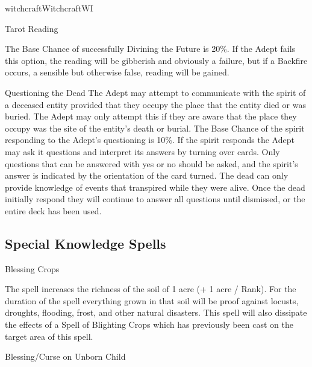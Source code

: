 \begin{college}[1.1]{witchcraft}{Witchcraft}{WI}
\begin{ritual}[Q-2]{Tarot Reading}
\begin{effects}
\begin{Description}
The Base Chance of successfully Divining the Future is 20\%.  If the
Adept fails this option, the reading will be gibberish and obviously a
failure, but if a Backfire occurs, a sensible but otherwise false,
reading will be gained.

\item[Questioning the Dead]
The Adept may attempt to communicate with the spirit of a deceased
entity provided that they occupy the place that the entity died or was
buried.  The Adept may only attempt this if they are aware that the
place they occupy was the site of the entity's death or burial.  The
Base Chance of the spirit responding to the Adept's questioning is
10\%.  If the spirit responds the Adept may ask it questions and
interpret its answers by turning over cards.  Only questions that can
be answered with yes or no should be asked, and the spirit's answer is
indicated by the orientation of the card turned.  The dead can only
provide knowledge of events that transpired while they were alive.
Once the dead initially respond they will continue to answer all
questions until dismissed, or the entire deck has been used.
\end{Description}
\end{effects}
\end{ritual}

\subsection{Special Knowledge Spells}

\begin{spell}[S-1]{Blessing Crops}

\begin{effects}
The spell increases the richness of the soil of 1 acre (+ 1 acre /
Rank).  For the duration of the spell everything grown in that soil
will be proof against locusts, droughts, flooding, frost, and other
natural disasters.  This spell will also dissipate the effects of a
Spell of Blighting Crops which has previously been cast on the target
area of this spell.
\end{effects}
\end{spell}

\begin{spell}[S-2]{Blessing/Curse on Unborn Child}


\end{spell}
\end{college}
